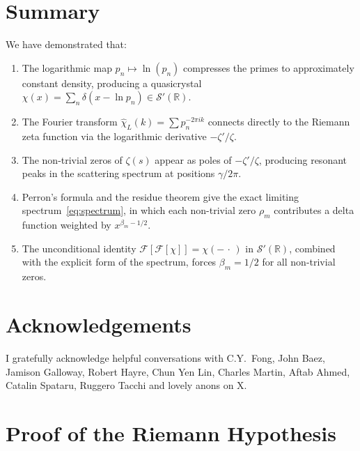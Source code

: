 \documentclass[11pt, oneside]{article}
\theoremstyle{definition}
\begin{document}
\section{Summary}

We have demonstrated that:
\begin{enumerate}
\item The logarithmic map $p_n \mapsto \ln(p_n)$ compresses the
  primes to approximately constant density, producing a
  quasicrystal
  $\chi(x) = \sum_n \delta(x - \ln p_n) \in \mathcal{S}'(\mathbb{R})$.
\item The Fourier transform
  $\hat{\chi}_L(k) = \sum p_n^{-2\pi ik}$ connects directly to the
  Riemann zeta function via the logarithmic derivative $-\zeta'/\zeta$.
\item The non-trivial zeros of $\zeta(s)$ appear as poles of
  $-\zeta'/\zeta$, producing resonant peaks in the scattering
  spectrum at positions $\gamma/2\pi$.
\item Perron's formula and the residue theorem give the exact
  limiting spectrum~\eqref{eq:spectrum}, in which each non-trivial
  zero $\rho_m$ contributes a delta function weighted by
  $x^{\beta_m - 1/2}$.
\item The unconditional identity
  $\mathcal{F}[\mathcal{F}[\chi]] = \chi(-\,\cdot\,)$ in
  $\mathcal{S}'(\mathbb{R})$, combined with the explicit form of
  the spectrum, forces $\beta_m = 1/2$ for all non-trivial zeros.
\end{enumerate}

\section{Acknowledgements}

I gratefully acknowledge helpful conversations with C.Y.\ Fong,
John Baez, Jamison Galloway, Robert Hayre, Chun Yen Lin,
Charles Martin, Aftab Ahmed, Catalin Spataru, Ruggero Tacchi and lovely anons on X.

\appendix

\section{Proof of the Riemann Hypothesis}
\label{app:proof}
\end{document}
